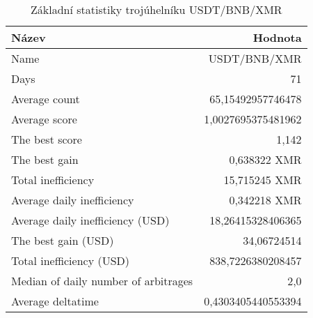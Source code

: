 \begin{table}\centering
\caption{Základní statistiky trojúhelníku USDT/BNB/XMR}
\label{USDTBNBXMR_stats}
\begin{tabular}{|| l | r ||}
\hline Název & Hodnota \\ 
\hline\hline Name & USDT/BNB/XMR \\ 
\hline Days & 71 \\ 
\hline Average count & 65,15492957746478 \\ 
\hline Average score & 1,0027695375481962 \\ 
\hline The best score & 1,142 \\ 
\hline The best gain & 0,638322 XMR \\ 
\hline Total inefficiency & 15,715245 XMR \\ 
\hline Average daily inefficiency & 0,342218 XMR \\ 
\hline Average daily inefficiency (USD) & 18,26415328406365 \\ 
\hline The best gain (USD) & 34,06724514 \\ 
\hline Total inefficiency (USD) & 838,7226380208457 \\ 
\hline Median of daily number of arbitrages & 2,0 \\ 
\hline Average deltatime & 0,4303405440553394 \\ 
\hline
\end{tabular}
\end{table}
